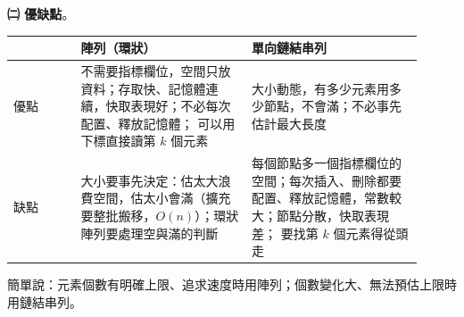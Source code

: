 \begin{pastsoln}
\textbf{㈡ 優缺點}。
\begin{center}
\small
\begin{tabular}{p{0.15\linewidth}p{0.38\linewidth}p{0.38\linewidth}}
\toprule
 & 陣列（環狀） & 單向鏈結串列 \\
\midrule
優點 & 不需要指標欄位，空間只放資料；存取快、記憶體連續，快取表現好；不必每次配置、釋放記憶體；
可以用下標直接讀第 $k$ 個元素 & 大小動態，有多少元素用多少節點，不會滿；不必事先估計最大長度 \\
\midrule
缺點 & 大小要事先決定：估太大浪費空間，估太小會滿（擴充要整批搬移，$O(n)$）；環狀陣列要處理空與滿的判斷 &
每個節點多一個指標欄位的空間；每次插入、刪除都要配置、釋放記憶體，常數較大；節點分散，快取表現差；
要找第 $k$ 個元素得從頭走 \\
\bottomrule
\end{tabular}
\end{center}
簡單說：元素個數有明確上限、追求速度時用陣列；個數變化大、無法預估上限時用鏈結串列。
\end{pastsoln}
